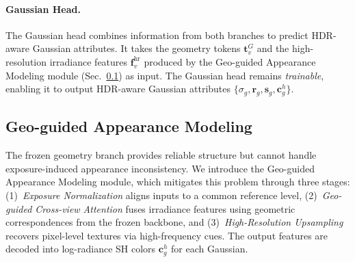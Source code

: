 \documentclass[runningheads]{llncs}
\begin{document}
\paragraph{\textbf{Gaussian Head.}}
The Gaussian head combines information from both branches to predict HDR-aware Gaussian attributes.
It takes the geometry tokens $\boldsymbol{t}_v^{G}$ and the high-resolution irradiance features $\boldsymbol{f}_v^{\text{hr}}$ produced by the Geo-guided Appearance Modeling module (Sec.~\ref{sec:appearance}) as input.
The Gaussian head remains \emph{trainable}, enabling it to output HDR-aware Gaussian attributes $\{\sigma_g, \boldsymbol{r}_g, \boldsymbol{s}_g, \boldsymbol{c}_g^{h}\}$.


\subsection{Geo-guided Appearance Modeling}
\label{sec:appearance}
The frozen geometry branch provides reliable structure but cannot handle exposure-induced appearance inconsistency.
We introduce the Geo-guided Appearance Modeling module, which mitigates this problem through three stages:
(1)~\emph{Exposure Normalization} aligns inputs to a common reference level,
(2)~\emph{Geo-guided Cross-view Attention} fuses irradiance features using geometric correspondences from the frozen backbone, and
(3)~\emph{High-Resolution Upsampling} recovers pixel-level textures via high-frequency cues.
The output features are decoded into log-radiance SH colors $\boldsymbol{c}_g^{h}$ for each Gaussian.
\end{document}
